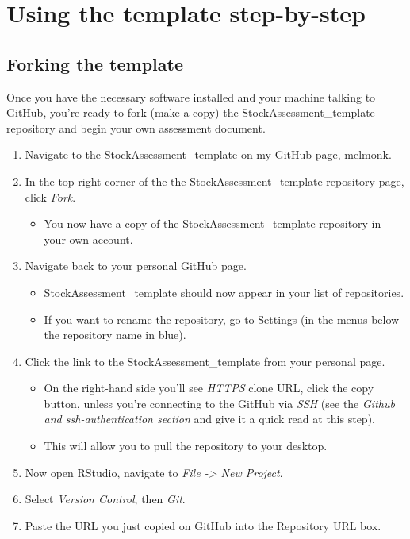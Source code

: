 \documentclass[12pt,]{article}
\providecommand{\tightlist}{%
  \setlength{\itemsep}{0pt}\setlength{\parskip}{0pt}}
\begin{document}
\section{Using the template
step-by-step}\label{using-the-template-step-by-step}

\subsection{Forking the template}\label{forking-the-template}

Once you have the necessary software installed and your machine talking
to GitHub, you're ready to fork (make a copy) the
StockAssessment\_template repository and begin your own assessment
document.

\begin{enumerate}
\def\labelenumi{\arabic{enumi}.}
\tightlist
\item
  Navigate to the
  \href{https://github.com/melmonk/StockAssessment_template}{StockAssessment\_template}
  on my GitHub page, melmonk.
\item
  In the top-right corner of the the StockAssessment\_template
  repository page, click \emph{Fork}.

  \begin{itemize}
  \tightlist
  \item
    You now have a copy of the StockAssessment\_template repository in
    your own account.
  \end{itemize}
\item
  Navigate back to your personal GitHub page.

  \begin{itemize}
  \tightlist
  \item
    StockAssessment\_template should now appear in your list of
    repositories.
  \item
    If you want to rename the repository, go to Settings (in the menus
    below the repository name in blue).
  \end{itemize}
\item
  Click the link to the StockAssessment\_template from your personal
  page.

  \begin{itemize}
  \tightlist
  \item
    On the right-hand side you'll see \emph{HTTPS} clone URL, click the
    copy button, unless you're connecting to the GitHub via \emph{SSH}
    (see the \emph{Github and ssh-authentication section} and give it a
    quick read at this step).
  \item
    This will allow you to pull the repository to your desktop.
  \end{itemize}
\item
  Now open RStudio, navigate to \emph{File -\textgreater{} New Project}.
\item
  Select \emph{Version Control}, then \emph{Git}.
\item
  Paste the URL you just copied on GitHub into the Repository URL box.


\end{enumerate}
\end{document}
